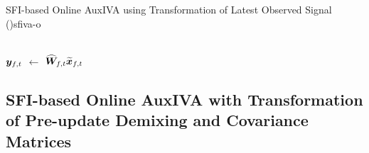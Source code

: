 \documentclass[sip,biber]{now-journal}
\begin{document}
\begin{algorithm}{SFI-based Online AuxIVA using Transformation of Latest Observed Signal (\SFIIVAo)}{sfiva-o}
\begin{pseudo}
       \ct{\eqref{eq:pb:w}, $\forall \freq$}\\
      {$\Est _{\ft}$} $\gets$ $\proj{\Demix }_{\ft} \refpos{\Obs} _{\ft}$ \ct{\eqref{eq:pb:y}, $\forall \freq$}
  \end{pseudo}
\end{algorithm}

\subsection{SFI-based Online AuxIVA with Transformation of Pre-update Demixing and Covariance Matrices}
\end{document}
